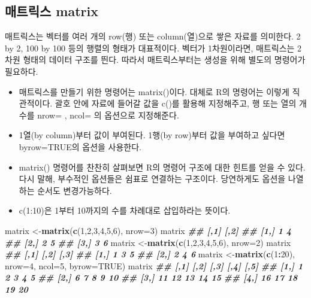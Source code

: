 \documentclass[
]{book}
\newenvironment{Shaded}{\begin{snugshade}}{\end{snugshade}}
\newcommand{\AttributeTok}[1]{\textcolor[rgb]{0.13,0.29,0.53}{#1}}
\newcommand{\ConstantTok}[1]{\textcolor[rgb]{0.56,0.35,0.01}{#1}}
\newcommand{\DecValTok}[1]{\textcolor[rgb]{0.00,0.00,0.81}{#1}}
\newcommand{\DocumentationTok}[1]{\textcolor[rgb]{0.56,0.35,0.01}{\textbf{\textit{#1}}}}
\newcommand{\FunctionTok}[1]{\textcolor[rgb]{0.13,0.29,0.53}{\textbf{#1}}}
\newcommand{\NormalTok}[1]{#1}
\newcommand{\OtherTok}[1]{\textcolor[rgb]{0.56,0.35,0.01}{#1}}
\newcommand{\SpecialCharTok}[1]{\textcolor[rgb]{0.81,0.36,0.00}{\textbf{#1}}}
\providecommand{\tightlist}{%
  \setlength{\itemsep}{0pt}\setlength{\parskip}{0pt}}
\begin{document}
\subsection{매트릭스 matrix}\label{uxb9e4uxd2b8uxb9aduxc2a4-matrix}

매트릭스는 벡터를 여러 개의 row(행) 또는 column(열)으로 쌓은 자료를 의미한다. 2 by 2, 100 by 100 등의 행렬의 형태가 대표적이다. 벡터가 1차원이라면, 매트릭스는 2차원 형태의 데이터 구조를 띈다. 따라서 매트릭스부터는 생성을 위해 별도의 명령어가 필요하다.

\begin{itemize}
\tightlist
\item
  매트릭스를 만들기 위한 명령어는 matrix()이다. 대체로 R의 명령어는 이렇게 직관적이다. 괄호 안에 자료에 들어갈 값을 c()를 활용해 지정해주고, 행 또는 열의 개수를 nrow= , ncol= 의 옵션으로 지정해준다.
\item
  1열(by column)부터 값이 부여된다. 1행(by row)부터 값을 부여하고 싶다면 byrow=TRUE의 옵션을 사용한다.
\item
  matrix() 명령어를 찬찬히 살펴보면 R의 명령어 구조에 대한 힌트를 얻을 수 있다. 다시 말해, 부수적인 옵션들은 쉼표로 연결하는 구조이다. 당연하게도 옵션을 나열하는 순서도 변경가능하다.
\item
  c(1:10)은 1부터 10까지의 수를 차례대로 삽입하라는 뜻이다.
\end{itemize}

\begin{Shaded}
\begin{Highlighting}[]
\NormalTok{matrix }\OtherTok{\textless{}{-}}\FunctionTok{matrix}\NormalTok{(}\FunctionTok{c}\NormalTok{(}\DecValTok{1}\NormalTok{,}\DecValTok{2}\NormalTok{,}\DecValTok{3}\NormalTok{,}\DecValTok{4}\NormalTok{,}\DecValTok{5}\NormalTok{,}\DecValTok{6}\NormalTok{), }\AttributeTok{nrow=}\DecValTok{3}\NormalTok{)}
\NormalTok{matrix}
\DocumentationTok{\#\#      [,1] [,2]}
\DocumentationTok{\#\# [1,]    1    4}
\DocumentationTok{\#\# [2,]    2    5}
\DocumentationTok{\#\# [3,]    3    6}
\NormalTok{matrix }\OtherTok{\textless{}{-}}\FunctionTok{matrix}\NormalTok{(}\FunctionTok{c}\NormalTok{(}\DecValTok{1}\NormalTok{,}\DecValTok{2}\NormalTok{,}\DecValTok{3}\NormalTok{,}\DecValTok{4}\NormalTok{,}\DecValTok{5}\NormalTok{,}\DecValTok{6}\NormalTok{), }\AttributeTok{nrow=}\DecValTok{2}\NormalTok{)}
\NormalTok{matrix}
\DocumentationTok{\#\#      [,1] [,2] [,3]}
\DocumentationTok{\#\# [1,]    1    3    5}
\DocumentationTok{\#\# [2,]    2    4    6}
\NormalTok{matrix }\OtherTok{\textless{}{-}}\FunctionTok{matrix}\NormalTok{(}\FunctionTok{c}\NormalTok{(}\DecValTok{1}\SpecialCharTok{:}\DecValTok{20}\NormalTok{), }\AttributeTok{nrow=}\DecValTok{4}\NormalTok{, }\AttributeTok{ncol=}\DecValTok{5}\NormalTok{, }\AttributeTok{byrow=}\ConstantTok{TRUE}\NormalTok{)}
\NormalTok{matrix}
\DocumentationTok{\#\#      [,1] [,2] [,3] [,4] [,5]}
\DocumentationTok{\#\# [1,]    1    2    3    4    5}
\DocumentationTok{\#\# [2,]    6    7    8    9   10}
\DocumentationTok{\#\# [3,]   11   12   13   14   15}
\DocumentationTok{\#\# [4,]   16   17   18   19   20}
\end{Highlighting}
\end{Shaded}
\end{document}
